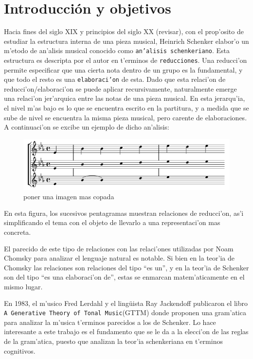 \section{Introducci\'on y objetivos}
Hacia fines del siglo XIX y principios del siglo XX (\alert{revisar}), con el prop'osito de estudiar la estructura interna de una pieza musical, 
Heinrich Schenker elabor'o un m'etodo de an'alisis musical conocido como \texttt{an'alisis schenkeriano}.
Esta estructura es descripta por el autor en t'erminos de \texttt{reducciones}. Una reducci'on permite especificar que una cierta nota dentro de un grupo es la fundamental, 
y que todo el resto es una \texttt{elaboraci'on} de esta. Dado que esta relaci'on de reducci'on/elaboraci'on se puede aplicar recursivamente, naturalmente emerge una relaci'on 
jer'arquica entre las notas de una pieza musical.  En esta jerarqu'ia, el nivel m'as bajo es lo que se encuentra escrito en la partitura, y a medida que se sube de nivel se 
encuentra la misma pieza musical, pero carente de elaboraciones. A continuaci'on se excibe un ejemplo de dicho an'alisis:


\begin{figure}[h]
\begin{center}
\includegraphics[width=12cm]{images/schenkerian_example.png}
\newline \alert{poner una imagen mas copada}
\end{center}
\end{figure}

En esta figura, los sucesivos pentagramas muestran relaciones de reducci'on, as'i simplificando el tema con el objeto de llevarlo a una representaci'on mas concreta.

El parecido de este tipo de relaciones con las relaci'ones utilizadas por Noam Chomsky para analizar el lenguaje natural es notable. 
Si bien en la teor'ia de Chomsky las relaciones son relaciones del tipo ``es un'', y en la teor'ia de Schenker son del tipo ``es una elaboraci'on de'', 
estas se enmarcan matem'aticamente en el mismo lugar.  

En 1983, el m'usico Fred Lerdahl y el ling\"uista Ray Jackendoff publicaron el libro 
\texttt{A Generative Theory of Tonal Music}(GTTM) donde proponen una gram'atica para analizar la m'usica t'erminos parecidos a los de Schenker. 
Lo hace interesante a este trabajo es el fundamento que se le da a la elecci'on de las reglas de la gram'atica, puesto que analizan la teor'ia 
schenkeriana en t'erminos cognitivos.  

